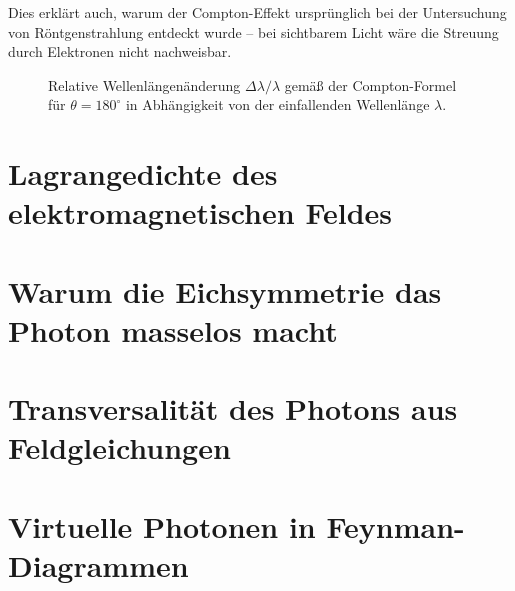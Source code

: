 Dies erklärt auch, warum der Compton-Effekt ursprünglich bei der Untersuchung von Röntgenstrahlung entdeckt wurde – bei sichtbarem Licht wäre die Streuung durch Elektronen nicht nachweisbar.



\begin{figure}[h]
	\centering
	\caption{Relative Wellenlängenänderung $\Delta \lambda / \lambda$ gemäß der Compton-Formel für $\theta = 180^\circ$ in Abhängigkeit von der einfallenden Wellenlänge $\lambda$.}
\end{figure}



\section{Lagrangedichte des elektromagnetischen Feldes}

\section{Warum die Eichsymmetrie das Photon masselos macht}

\section{Transversalität des Photons aus Feldgleichungen}

\section{Virtuelle Photonen in Feynman-Diagrammen}

